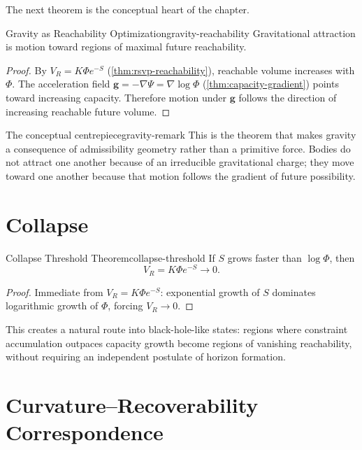 \documentclass[12pt,twoside,openright]{book}
\begin{document}
The next theorem is the conceptual heart of the chapter.

\begin{theorem}{Gravity as Reachability Optimization}{gravity-reachability}
  Gravitational attraction is motion toward regions of
  maximal future reachability.
\end{theorem}

\begin{proof}
  By $V_R = K\Phi e^{-S}$ (\cref{thm:rsvp-reachability}),
  reachable volume increases with $\Phi$. The acceleration
  field $\mathbf{g} = -\nabla\Psi = \nabla\log\Phi$
  (\cref{thm:capacity-gradient}) points toward increasing
  capacity. Therefore motion under $\mathbf{g}$ follows the
  direction of increasing reachable future volume.
\end{proof}

\begin{remark}{The conceptual centrepiece}{gravity-remark}
  This is the theorem that makes gravity a consequence of
  admissibility geometry rather than a primitive force.
  Bodies do not attract one another because of an
  irreducible gravitational charge; they move toward one
  another because that motion follows the gradient of
  future possibility.
\end{remark}

\section{Collapse}
\label{sec:ch17-collapse}

\begin{theorem}{Collapse Threshold Theorem}{collapse-threshold}
  If $S$ grows faster than $\log\Phi$, then
  \[
    V_R = K\Phi e^{-S} \to 0.
  \]
\end{theorem}

\begin{proof}
  Immediate from $V_R = K\Phi e^{-S}$: exponential growth
  of $S$ dominates logarithmic growth of $\Phi$, forcing
  $V_R \to 0$.
\end{proof}

This creates a natural route into black-hole-like states:
regions where constraint accumulation outpaces capacity
growth become regions of vanishing reachability, without
requiring an independent postulate of horizon formation.

\section{Curvature--Recoverability Correspondence}
\label{sec:ch17-curv-reco}
\end{document}
